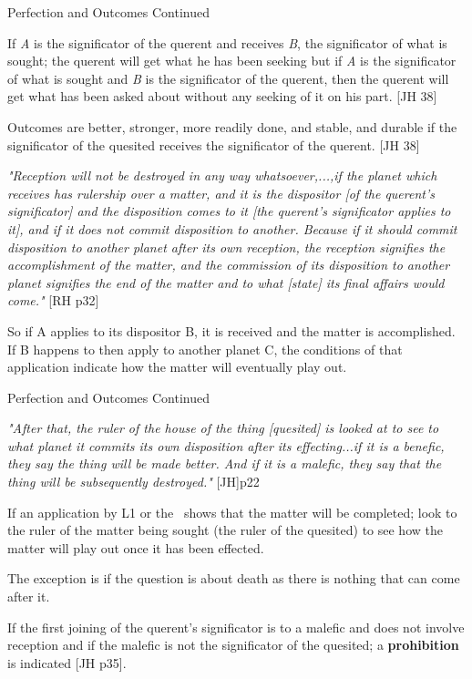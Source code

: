 \begin{frame}[t]{Perfection and Outcomes Continued}

If \textsl{A} is the significator of the querent and receives \textsl{B}, the significator of what is sought; the querent will get what he has been seeking but if \textsl{A} is the significator of what is sought and \textsl{B} is the significator of the querent, then the querent will get what has been asked about without any seeking of it on his part. [JH 38]

Outcomes are better, stronger, more readily done, and stable, and durable if the significator of the quesited receives the significator of the querent. [JH 38]

\begin{block}{}
\textsl{"Reception will not be destroyed in any way whatsoever,...,if the planet which receives has rulership over a matter, and it is the dispositor [of the querent's significator] and the disposition comes to it [the querent's significator applies to it], and if it does not commit disposition to another. Because if it should commit disposition to another planet after its own reception, the reception signifies the accomplishment of the matter, and the commission of its disposition to another planet signifies the end of the matter and to what [state] its final affairs would come."} [RH p32]
\end{block}
So if A applies to its dispositor B, it is received and the matter is accomplished. If B happens to then apply to another planet C, the conditions of that application indicate how the matter will eventually play out.
\end{frame}
\begin{frame}[t]{Perfection and Outcomes Continued}

\begin{block}{}
\textsl{"After that, the ruler of the house of the thing [quesited] is looked at to see to what planet it commits its own disposition after its effecting...if it is a benefic, they say the thing will be made better. And if it is a malefic, they say that the thing will be subsequently destroyed."} [JH]p22
\end{block}
If an application by L1 or the \Moon\ shows that the matter will be completed; look to the ruler of the matter being sought (the ruler of the quesited) to see how the matter will play out once it has been effected.

The exception is if the question is about death as there is nothing that can come after it.

If the first joining of the querent's significator is to a malefic and does not involve reception and if the malefic is not the significator of the quesited;  a \textbf{prohibition} is indicated [JH p35].

\end{frame}
